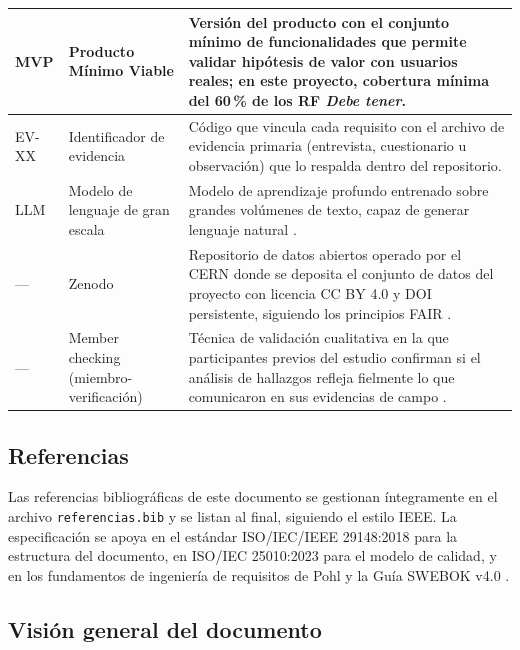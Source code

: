 \documentclass[journal,onecolumn]{IEEEtran}
\begin{document}
\begin{longtable}{|p{2.2cm}|p{3.3cm}|p{9.5cm}|}
		MVP & Producto Mínimo Viable & Versión del producto con el conjunto mínimo de funcionalidades que permite validar hipótesis de valor con usuarios reales; en este proyecto, cobertura mínima del 60\,\% de los RF \emph{Debe tener}. \\ \hline
		
		EV-XX & Identificador de evidencia & Código que vincula cada requisito con el archivo de evidencia primaria (entrevista, cuestionario u observación) que lo respalda dentro del repositorio. \\ \hline
		
		LLM & Modelo de lenguaje de gran escala & Modelo de aprendizaje profundo entrenado sobre grandes volúmenes de texto, capaz de generar lenguaje natural \cite{cheng2026, vogelsang2024}. \\ \hline
		
		--- & Zenodo & Repositorio de datos abiertos operado por el CERN donde se deposita el conjunto de datos del proyecto con licencia CC BY 4.0 y DOI persistente, siguiendo los principios FAIR \cite{wilkinson2016}. \\ \hline
		
		--- & Member checking (miembro-verificación) & Técnica de validación cualitativa en la que participantes previos del estudio confirman si el análisis de hallazgos refleja fielmente lo que comunicaron en sus evidencias de campo \cite{birt2016}. \\ \hline
	\end{longtable}
	
	\subsection{Referencias}
	\label{sec:referencias-intro}
	
	Las referencias bibliográficas de este documento se gestionan íntegramente en el
	archivo \texttt{referencias.bib} y se listan al final, siguiendo el estilo IEEE.
	La especificación se apoya en el estándar ISO/IEC/IEEE 29148:2018 \cite{iso29148}
	para la estructura del documento, en ISO/IEC 25010:2023 \cite{iso25010} para el
	modelo de calidad, y en los fundamentos de ingeniería de requisitos de
	Pohl \cite{pohl2025} y la Guía SWEBOK v4.0 \cite{swebok2024}.
	
	\subsection{Visión general del documento}
	\label{sec:vision}
	
\end{document}
